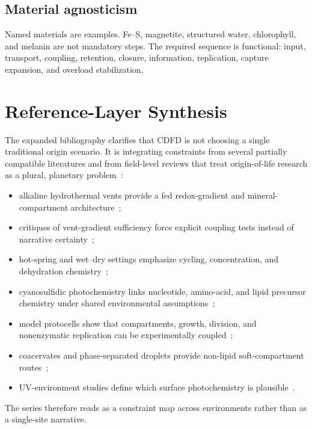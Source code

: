 \documentclass[11pt,a4paper]{article}
\begin{document}
\subsection{Material agnosticism}
Named materials are examples. Fe--S, magnetite, structured water, chlorophyll, and melanin are not mandatory steps. The required sequence is functional: input, transport, coupling, retention, closure, information, replication, capture expansion, and overload stabilization.

\section{Reference-Layer Synthesis}
The expanded bibliography clarifies that CDFD is not choosing a single traditional origin scenario. It is integrating constraints from several partially compatible literatures and from field-level reviews that treat origin-of-life research as a plural, planetary problem~\cite{Preiner2020,Sasselov2020}:
\begin{itemize}
\item alkaline hydrothermal vents provide a fed redox-gradient and mineral-compartment architecture~\cite{Russell1994,Martin2007,Sojo2016};
\item critiques of vent-gradient sufficiency force explicit coupling tests instead of narrative certainty~\cite{Jackson2016};
\item hot-spring and wet--dry settings emphasize cycling, concentration, and dehydration chemistry~\cite{Damer2020};
\item cyanosulfidic photochemistry links nucleotide, amino-acid, and lipid precursor chemistry under shared environmental assumptions~\cite{Patel2015};
\item model protocells show that compartments, growth, division, and nonenzymatic replication can be experimentally coupled~\cite{Hanczyc2003,Mansy2008,Adamala2013};
\item coacervates and phase-separated droplets provide non-lipid soft-compartment routes~\cite{Matsuo2021,Nakashima2021};
\item UV-environment studies define which surface photochemistry is plausible~\cite{Ranjan2017,Ranjan2022}.
\end{itemize}
The series therefore reads as a constraint map across environments rather than as a single-site narrative.
\end{document}

